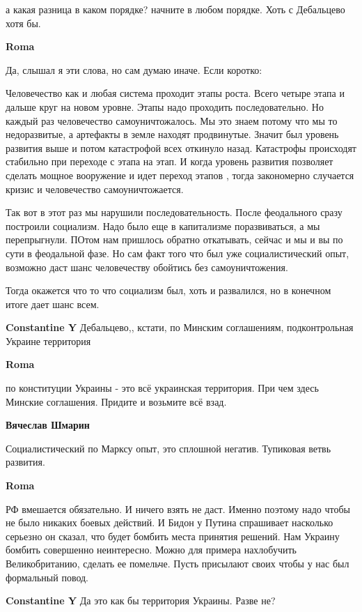 \begin{itemize}
а какая разница в каком порядке? начните в любом порядке. Хоть с Дебальцево хотя бы.

\textbf{Roma}

Да, слышал я эти слова, но сам думаю иначе. Если коротко:

Человечество как и любая система проходит этапы роста. Всего четыре этапа и
дальше круг на новом уровне. Этапы надо проходить последовательно. Но каждый
раз человечество самоуничтожалось. Мы это знаем потому что мы то недоразвитые,
а артефакты в земле находят продвинутые. Значит был уровень развития выше и
потом катастрофой всех откинуло назад.  Катастрофы происходят стабильно при
переходе с этапа на этап. И когда уровень развития позволяет сделать мощное
вооружение и идет переход этапов , тогда закономерно случается кризис и
человечество самоуничтожается. 

Так вот в этот раз мы нарушили последовательность. После феодального сразу
построили социализм. Надо было еще в капитализме поразвиваться, а мы
перепрыгнули. ПОтом нам пришлось обратно откатывать, сейчас и мы и вы по сути
в феодальной фазе. Но сам факт того что был уже социалистический опыт, возможно
даст шанс человечеству обойтись без самоуничтожения. 

Тогда окажется что то что социализм был, хоть и развалился, но в конечном итоге
дает шанс всем.

\textbf{Constantine Y}
Дебальцево,, кстати, по Минским соглашениям, подконтрольная Украине территория

\textbf{Roma}

по конституции Украины - это всё украинская территория. При чем здесь Минские
соглашения. Придите и возьмите всё взад.

\textbf{Вячеслав Шмарин}

Социалистический по Марксу опыт, это сплошной негатив. Тупиковая ветвь развития.

\textbf{Roma}

РФ вмешается обязательно. И ничего взять не даст. Именно поэтому надо чтобы не
было никаких боевых действий. И Бидон у Путина спрашивает насколько серьезно он
сказал, что будет бомбить места принятия решений. Нам Украину бомбить
совершенно неинтересно. Можно для примера нахлобучить Великобританию, сделать
ее помельче. Пусть присылают своих чтобы у нас был формальный повод.

\textbf{Constantine Y}
Да это как бы территория Украины. Разве не?


\end{itemize}
